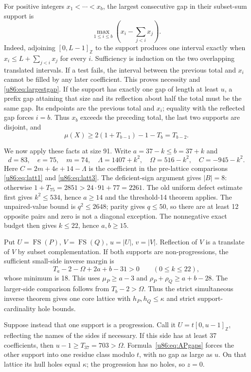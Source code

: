 \documentclass[11pt,a4paper]{article}
\theoremstyle{remark}
\newcommand{\FS}{\operatorname{FS}}
\newcommand{\Z}{\mathbb Z}
\begin{document}
For positive integers $x_1<\cdots<x_b$, the largest consecutive gap in
their subset-sum support is
\begin{equation}\label{u86:eq:largestgap}
 \max_{1\le i\le b}\left(x_i-\sum_{j<i}x_j\right).
\end{equation}
Indeed, adjoining $[0,L-1]_{\Z}$ to the support produces one interval
exactly when $x_i\le L+\sum_{j<i}x_j$ for every $i$. Sufficiency is
induction on the two overlapping translated intervals. If a test fails,
the interval between the previous total and $x_i$ cannot be filled by
any later coefficient. This proves necessity and \eqref{u86:eq:largestgap}.
If the support has exactly one gap of length at least $u$, a prefix gap
attaining that size and its reflection about half the total must be the
same gap. Its endpoints are the previous total and $x_i$; equality with
the reflected gap forces $i=b$. Thus $x_b$ exceeds the preceding total,
the last two supports are disjoint, and
\begin{equation}\label{u86:eq:dominantmu}
 \mu(X)\ge 2(1+T_{b-1})-1-T_b=T_{b-2}.
\end{equation}

We now apply these facts at size 91. Write $a=37-k\le b=37+k$ and
\[
 d=83,\quad e=75,\quad m=74,\quad
 \Lambda=1407+k^2,\quad\Omega=516-k^2,\quad C=-945-k^2.
\]
Here $C=2m+4e+14-\Lambda$ is the coefficient in the pre-lattice
comparisons \eqref{u86:eq:latt1} and \eqref{u86:eq:latt3}.
The deficient-sign argument gives $|B|=8$: otherwise
$1+T_{75}=2851>24\cdot91+77=2261$.
The old uniform defect estimate first gives $k^2\le534$, hence
$a\ge14$ and the threshold-14 theorem applies. The unpaired-value bound
is $q^2\le2648$; parity gives $q\le50$, so there are at least 12
opposite pairs and zero is not a diagonal exception. The nonnegative
exact budget then gives $k\le22$, hence $a,b\ge15$.

Put $U=\FS(P)$, $V=\FS(Q)$, $u=|U|$, $v=|V|$. Reflection of $V$ is
a translate of $V$ by subset complementation. If both supports are
non-progressions, the sufficient small-side inverse margin is
\[
 T_a-2-\Omega+2a+b-31>0\qquad(0\le k\le22),
\]
whose minimum is 18. This uses $\mu_P\ge a-3$ and
$\rho_P+\rho_Q\ge a+b-28$. The larger-side comparison follows from
$T_b-2>\Omega$. Thus the strict simultaneous inverse theorem gives
one core lattice with $h_P,h_Q\le\kappa$ and strict support-cardinality
hole bounds.

Suppose instead that one support is a progression. Call it
$U=t[0,u-1]_{\Z}$, reflecting the names of the sides if necessary.
If this side has at least 37 coefficients, then
$u-1\ge T_{37}=703>\Omega$. Formula~\eqref{u86:eq:APgaps} forces the other
support into one residue class modulo $t$, with no gap as large as $u$.
On that lattice its hull holes equal $\kappa$; the progression has no
holes, so $z=0$.
\end{document}
